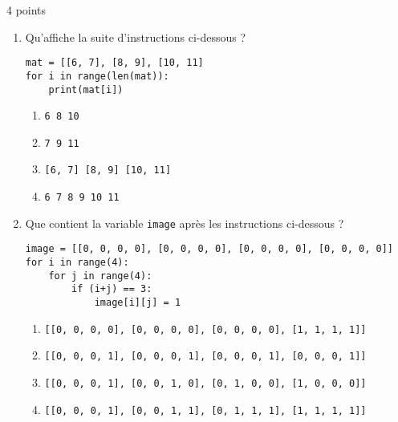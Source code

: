 \documentclass[a4paper,dvipsnames]{article}
\begin{document}
\begin{exercice}{4 points}{}
\begin{enumerate}
      Laquelle des expressions suivantes vaut \texttt{7} ?
      \begin{multicols}{4}
       \begin{enumerate}
	 \item \texttt{tableau[3, 1]}   
	 \item \texttt{tableau[3][1]}
	 \item \texttt{tableau[2, 0]}
	 \item \texttt{tableau[2][0]}
       \end{enumerate} 
      \end{multicols}
    \item Qu'affiche la suite d'instructions ci-dessous ?

      \begin{verbatim}
mat = [[6, 7], [8, 9], [10, 11]
for i in range(len(mat)):
    print(mat[i])
      \end{verbatim}

      \begin{multicols}{2}
        \begin{enumerate}
	  \item \texttt{6 8 10}
	  \item \texttt{7 9 11}
	  \item \texttt{[6, 7] [8, 9] [10, 11]}
	  \item \texttt{6 7 8 9 10 11}
        \end{enumerate}
      \end{multicols}

    \item Que contient la variable \texttt{image} après les instructions ci-dessous ?

      \begin{verbatim}
image = [[0, 0, 0, 0], [0, 0, 0, 0], [0, 0, 0, 0], [0, 0, 0, 0]]
for i in range(4):
    for j in range(4):
        if (i+j) == 3:
            image[i][j] = 1
      \end{verbatim}

      \begin{enumerate}
	\item \texttt{[[0, 0, 0, 0], [0, 0, 0, 0], [0, 0, 0, 0], [1, 1, 1, 1]]} 
	\item \texttt{[[0, 0, 0, 1], [0, 0, 0, 1], [0, 0, 0, 1], [0, 0, 0, 1]]}
	\item \texttt{[[0, 0, 0, 1], [0, 0, 1, 0], [0, 1, 0, 0], [1, 0, 0, 0]]}
	\item \texttt{[[0, 0, 0, 1], [0, 0, 1, 1], [0, 1, 1, 1], [1, 1, 1, 1]]}
      \end{enumerate}
  \end{enumerate}
\end{exercice}
\end{document}
